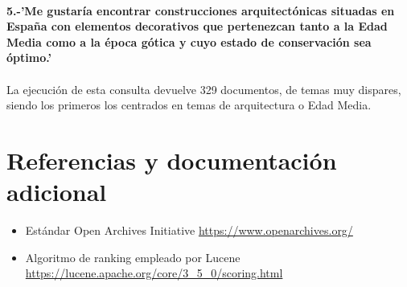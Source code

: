 \documentclass[a4paper]{article}
\begin{document}
\paragraph{}\textbf{5.-'Me gustaría encontrar construcciones arquitectónicas situadas en España con elementos decorativos que pertenezcan tanto a la Edad Media como a la época gótica y cuyo estado de conservación sea óptimo.'}
\paragraph{}La ejecución de esta consulta devuelve 329 documentos, de temas muy dispares, siendo los primeros los centrados en temas de arquitectura o Edad Media.

\section{Referencias y documentación adicional}
\begin{itemize}
	\item Estándar Open Archives Initiative
	\newline \url{https://www.openarchives.org/}
	\item Algoritmo de ranking empleado por Lucene
	\newline \url{https://lucene.apache.org/core/3_5_0/scoring.html}
\end{itemize}
\end{document}
